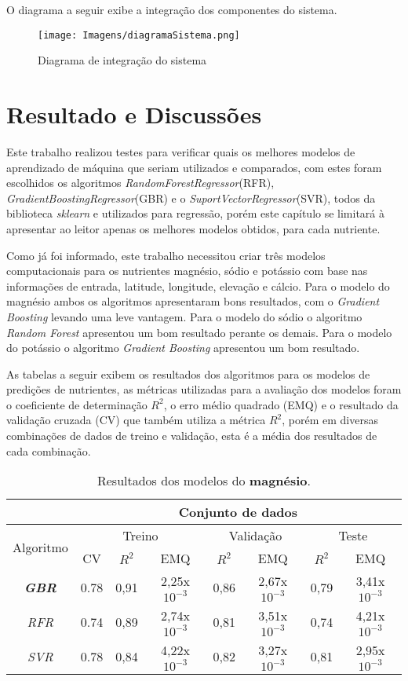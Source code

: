 \documentclass[
12pt,				%
oneside,			%
a4paper,			%
english,			%
french,				%
spanish,			%
brazil				%
]{abntex2}
\begin{document}
O diagrama a seguir exibe a integração dos componentes do sistema.

\begin{figure}[H]
	\caption{Diagrama de integração do sistema}
	\centering %
	\texttt{[image: Imagens/diagramaSistema.png]} %
	\label{fig:diagramsistema}
\end{figure}


\chapter{Resultado e Discussões}


Este trabalho realizou testes para verificar quais os melhores modelos de aprendizado de máquina que seriam utilizados e comparados, com estes foram escolhidos os algoritmos \textit{RandomForestRegressor}(RFR), \textit{GradientBoostingRegressor}(GBR) e o \textit{SuportVectorRegressor}(SVR), todos da biblioteca \textit{sklearn} e utilizados para regressão, porém este capítulo se limitará à apresentar ao leitor apenas os melhores modelos obtidos, para cada nutriente.

Como já foi informado, este trabalho necessitou criar três modelos computacionais para os nutrientes magnésio, sódio e potássio com base nas informações de entrada, latitude, longitude, elevação e cálcio. Para o modelo do magnésio ambos os algoritmos apresentaram bons resultados, com o \textit{Gradient Boosting} levando uma leve vantagem. Para o modelo do sódio o algoritmo \textit{Random Forest} apresentou um bom resultado perante os demais. Para o modelo do potássio o algoritmo \textit{Gradient Boosting} apresentou um bom resultado.

As tabelas a seguir exibem os resultados dos algoritmos para os modelos de predições de nutrientes, as métricas utilizadas para a avaliação dos modelos foram o coeficiente de determinação \textit{$R^2$}, o erro médio quadrado (EMQ) e o resultado da validação cruzada (CV) que também utiliza a métrica \textit{$R^2$}, porém em diversas combinações de dados de treino e validação, esta é a média dos resultados de cada combinação.  


\begin{table}[H]
\centering
\caption{Resultados dos modelos do \textbf{magnésio}.}
\begin{tabular}{c|c|c|c|c|c|c|c}
		&\multicolumn{7}{c}{Conjunto de dados}\\\hline
		\multirow{2}{*}{Algoritmo} & \multicolumn{3}{c}{Treino} & \multicolumn{2}{c}{Validação}& \multicolumn{2}{c}{Teste}\\\cline{2-8}
		&CV& $R^2$ & EMQ & $R^2$ & EMQ & $R^2$ & EMQ\\\hline
		\textit{\textbf{GBR}}&0.78&0,91&2,25x$10^{-3}$&0,86&2,67x$10^{-3}$&0,79&3,41x$10^{-3}$\\
		\textit{RFR}&0.74&0,89&2,74x$10^{-3}$&0,81&3,51x$10^{-3}$&0,74&4,21x$10^{-3}$\\
		\textit{SVR}&0.78&0,84&4,22x$10^{-3}$&0,82&3,27x$10^{-3}$&0,81&2,95x$10^{-3}$\\
\end{tabular}	
\label{tab:resmag}
\end{table}
\end{document}
